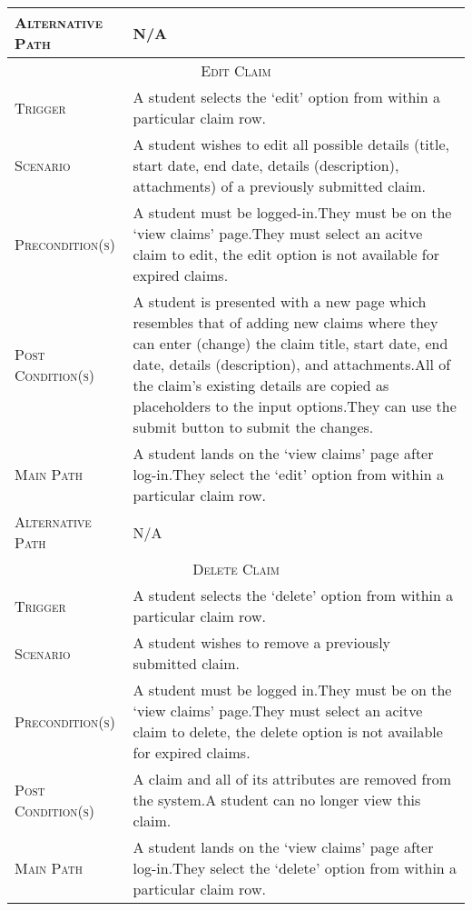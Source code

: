 \documentclass[11pt, english]{article}
\begin{document}
\begin{center}
\begin{longtable}{p{3cm}|p{9cm}}
		\textsc{Alternative Path} & N/A\\
		\hline
		\multicolumn{2}{c}{\textsc{Edit Claim}}\\
		\hline
		\textsc{Trigger} & A student selects the `edit' option from within a particular claim row.\\
		\textsc{Scenario} & A student wishes to edit all possible details (title, start date, end date, details (description), attachments) of a previously submitted claim.\\
		\textsc{Precondition(s)} & A student must be logged-in.\newline They must be on the `view claims' page.\newline They must select an acitve claim to edit, the edit option is not available for expired claims.\\
		\textsc{Post Condition(s)} & A student is presented with a new page which resembles that of adding new claims where they can enter (change) the claim title, start date, end date, details (description), and attachments.\newline All of the claim's existing details are copied as placeholders to the input options.\newline They can use the submit button to submit the changes.\\
		\textsc{Main Path} & A student lands on the `view claims' page after log-in.\newline They select the `edit' option from within a particular claim row.\\
		\textsc{Alternative Path} & N/A\\
		\hline
		\multicolumn{2}{c}{\textsc{Delete Claim}}\\
		\hline
		\textsc{Trigger} & A student selects the `delete' option from within a particular claim row.\\
		\textsc{Scenario} & A student wishes to remove a previously submitted claim.\\
		\textsc{Precondition(s)} & A student must be logged in.\newline They must be on the `view claims' page.\newline They must select an acitve claim to delete, the delete option is not available for expired claims.\\
		\textsc{Post Condition(s)} & A claim and all of its attributes are removed from the system.\newline A student can no longer view this claim.\\
		\textsc{Main Path} & A student lands on the `view claims' page after log-in.\newline They select the `delete' option from within a particular claim row.\\

\end{longtable}
\end{center}
\end{document}
